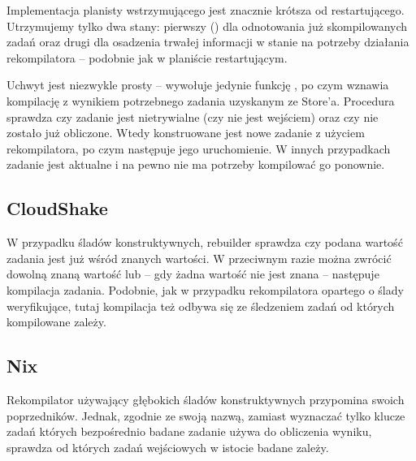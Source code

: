 \pagebreak



Implementacja planisty wstrzymującego jest znacznie krótsza od restartującego. Utrzymujemy tylko dwa stany: pierwszy () dla odnotowania już skompilowanych zadań oraz drugi dla osadzenia trwałej informacji w stanie na potrzeby działania rekompilatora -- podobnie jak w planiście restartującym.



Uchwyt  jest niezwykle prosty -- wywołuje jedynie funkcję , po czym wznawia kompilację z wynikiem potrzebnego zadania uzyskanym ze Store'a. Procedura  sprawdza czy zadanie jest nietrywialne (czy nie jest wejściem) oraz czy nie zostało już obliczone. Wtedy konstruowane jest nowe zadanie z użyciem rekompilatora, po czym następuje jego uruchomienie. W innych przypadkach zadanie jest aktualne i na pewno nie ma potrzeby kompilować go ponownie.

\subsection{CloudShake}





W przypadku śladów konstruktywnych, rebuilder sprawdza czy podana wartość zadania jest już wśród znanych wartości. W przeciwnym razie można zwrócić dowolną znaną wartość lub -- gdy żadna wartość nie jest znana -- następuje kompilacja zadania. Podobnie, jak w przypadku rekompilatora opartego o ślady weryfikujące, tutaj kompilacja też odbywa się ze śledzeniem zadań od których kompilowane zależy.


\subsection{Nix}



Rekompilator używający głębokich śladów konstruktywnych przypomina swoich poprzedników. Jednak, zgodnie ze swoją nazwą, zamiast wyznaczać tylko klucze zadań których bezpośrednio badane zadanie używa do obliczenia wyniku, sprawdza od których zadań wejściowych w istocie badane zależy.

